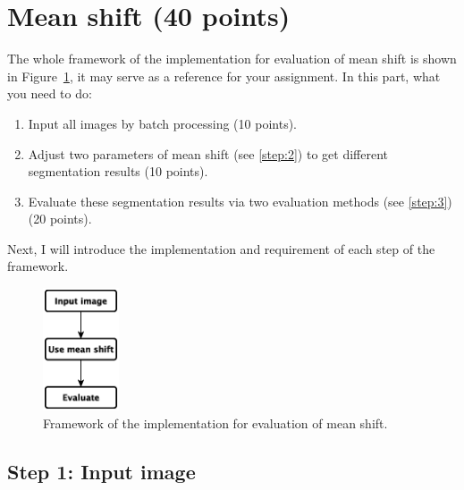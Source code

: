 \documentclass[12pt]{article}
\begin{document}
\section{Mean shift (40 points)}
The whole framework of the implementation for evaluation of mean shift is shown in Figure~\ref{fig:mean}, it may serve as a reference for your assignment. In this part, what you need to do:
\begin{enumerate}
\item Input all images by batch processing (10 points).
\item Adjust two parameters of mean shift (see \ref{step:2}) to get different segmentation results (10 points).
\item Evaluate these segmentation results via two evaluation methods (see \ref{step:3}) (20 points).
\end{enumerate}
Next, I will introduce the implementation and requirement of each step of the framework.
\begin{figure}[!ht]
\centering
\includegraphics[width=0.2\textwidth]{chartMean.eps}
\caption{Framework of the implementation for evaluation of mean shift.}
\label{fig:mean}
\end{figure}


\subsection{Step 1: Input image}
\end{document}
